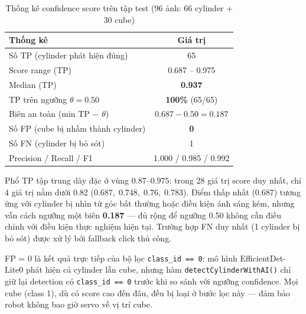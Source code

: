 \begin{table}[htbp]
  \centering
  \caption{Thống kê confidence score trên tập test
           (96 ảnh: 66 cylinder + 30 cube)}
  \label{tab:ai3-conf}
  \small
  \begin{tabular}{lc}
    \toprule
    \textbf{Thống kê}                              & \textbf{Giá trị} \\
    \midrule
    Số TP (cylinder phát hiện đúng)                & 65 \\
    Score range (TP)                               & 0.687 -- 0.975 \\
    Median (TP)                                    & \textbf{0.937} \\
    TP trên ngưỡng $\theta=0.50$                   & \textbf{100\%} (65/65) \\
    Biên an toàn (min TP $-$ $\theta$)             & $0.687 - 0.50 = \mathbf{0.187}$ \\
    \midrule
    Số FP (cube bị nhầm thành cylinder)            & \textbf{0} \\
    Số FN (cylinder bị bỏ sót)                    & 1 \\
    Precision / Recall / F1                        & 1.000 / 0.985 / 0.992 \\
    \bottomrule
  \end{tabular}
\end{table}

Phổ TP tập trung dày đặc ở vùng $0.87$--$0.975$: trong 28 giá
trị score duy nhất, chỉ 4 giá trị nằm dưới 0.82
($0.687,\;0.748,\;0.76,\;0.783$). Điểm thấp nhất (0.687) tương
ứng với cylinder bị nhìn từ góc bất thường hoặc điều kiện ánh
sáng kém, nhưng vẫn cách ngưỡng một biên \textbf{0.187} --- đủ
rộng để ngưỡng 0.50 không cần điều chỉnh với điều kiện thực
nghiệm hiện tại. Trường hợp FN duy nhất (1 cylinder bị bỏ sót)
được xử lý bởi fallback click thủ công.

FP = 0 là kết quả trực tiếp của bộ lọc \texttt{class\_id == 0}:
mô hình EfficientDet-Lite0 phát hiện cả cylinder lẫn cube, nhưng
hàm \texttt{detectCylinderWithAI()} chỉ giữ lại detection có
\texttt{class\_id == 0} trước khi so sánh với ngưỡng confidence.
Mọi cube (class 1), dù có score cao đến đâu, đều bị loại ở bước
lọc này --- đảm bảo robot không bao giờ servo về vị trí cube.
